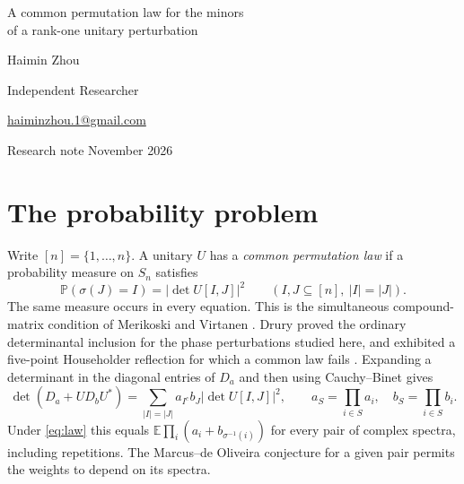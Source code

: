 \documentclass[11pt]{article}
\newcommand{\Prb}{\mathbb P}
\begin{document}
\begin{center}
{\LARGE A common permutation law for the minors\\[3pt] of a rank-one unitary perturbation\par}
\vspace{8pt}
{\large Haimin Zhou\par}
\vspace{3pt}
{\small Independent Researcher\par}
{\small \href{mailto:haiminzhou.1@gmail.com}{haiminzhou.1@gmail.com}\par}
\vspace{5pt}
{\small Research note  November 2026}
\end{center}
\begin{abstract}
For a unitary matrix acting by a phase on a line and by the identity on its orthogonal complement, we characterize the existence of a random permutation whose set images simultaneously realize the squared moduli of every minor. In dimension five the criterion is a single fourth-moment inequality. In all dimensions the minimum required mass on nonidentity permutations is the maximum of explicit quadratic functions indexed by signed set partitions. The proof constructs an optimizer by induction and a probability law by fractional triangle packing. We give a six-dimensional obstruction invisible to the expected number of moved points and explain its relation to a classical triangle-decomposition inequality.
\end{abstract}

\section{The probability problem}
Write $[n]=\{1,\ldots,n\}$. A unitary $U$ has a \emph{common permutation law} if a probability measure on $S_n$ satisfies
\begin{equation}\label{eq:law}
  \Prb(\sigma(J)=I)=|\det U[I,J]|^2
  \qquad (I,J\subseteq[n],\ |I|=|J|).
\end{equation}
The same measure occurs in every equation. This is the simultaneous compound-matrix condition of Merikoski and Virtanen \cite{MV}. Drury proved the ordinary determinantal inclusion for the phase perturbations studied here, and exhibited a five-point Householder reflection for which a common law fails \cite[Corollary 4 and section 3]{Drury}. Expanding a determinant in the diagonal entries of $D_a$ and then using Cauchy--Binet gives
\[
 \det(D_a+U D_b U^*)=
 \sum_{|I|=|J|} a_{I^c} b_J |\det U[I,J]|^2,
 \qquad a_S=\prod_{i\in S}a_i,\quad b_S=\prod_{i\in S}b_i .
\]
Under \eqref{eq:law} this equals $\mathbb E\prod_i(a_i+b_{\sigma^{-1}(i)})$ for every pair of complex spectra, including repetitions. The Marcus--de Oliveira conjecture for a given pair permits the weights to depend on its spectra.
\end{document}
